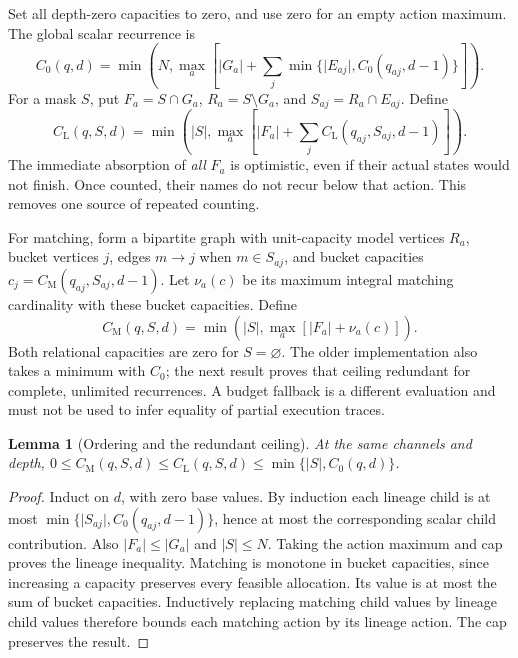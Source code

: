 \documentclass[11pt]{article}
\newtheorem{lemma}[theorem]{Lemma}
\theoremstyle{definition}
\newcommand{\card}[1]{\lvert #1\rvert}
\newcommand{\CL}{C_{\mathrm L}}
\newcommand{\CM}{C_{\mathrm M}}
\begin{document}
Set all depth-zero capacities to zero, and use zero for an empty action maximum.
The global scalar recurrence is
\begin{equation}\label{eq:scalar}
C_0(q,d)=\min\left(N,\max_a\left[\card{G_a}+
       \sum_j\min\{\card{E_{aj}},C_0(q_{aj},d-1)\}\right]\right).
\end{equation}
For a mask $S$, put $F_a=S\cap G_a$, $R_a=S\setminus G_a$, and
$S_{aj}=R_a\cap E_{aj}$. Define
\begin{equation}\label{eq:lineage}
\CL(q,S,d)=\min\left(\card S,\max_a\left[
                   \card{F_a}+\sum_j\CL(q_{aj},S_{aj},d-1)\right]\right).
\end{equation}
The immediate absorption of \emph{all} $F_a$ is optimistic, even if their actual
states would not finish. Once counted, their names do not recur below that
action. This removes one source of repeated counting.

For matching, form a bipartite graph with unit-capacity model vertices $R_a$,
bucket vertices $j$, edges $m\to j$ when $m\in S_{aj}$, and bucket capacities
$c_j=\CM(q_{aj},S_{aj},d-1)$. Let $\nu_a(c)$ be its maximum integral matching
cardinality with these bucket capacities. Define
\begin{equation}\label{eq:matching}
\CM(q,S,d)=\min\left(\card S,\max_a[\card{F_a}+\nu_a(c)]\right).
\end{equation}
Both relational capacities are zero for $S=\varnothing$. The older implementation
also takes a minimum with $C_0$; the next result proves that ceiling redundant
for complete, unlimited recurrences. A budget fallback is a different evaluation
and must not be used to infer equality of partial execution traces.

\begin{lemma}[Ordering and the redundant ceiling]\label{lem:order}
At the same channels and depth,
$0\leq\CM(q,S,d)\leq\CL(q,S,d)\leq\min\{\card S,C_0(q,d)\}$.
\end{lemma}
\begin{proof}
Induct on $d$, with zero base values. By induction each lineage child is at
most $\min\{\card{S_{aj}},C_0(q_{aj},d-1)\}$, hence at most the corresponding
scalar child contribution. Also $\card{F_a}\leq\card{G_a}$ and $\card S\leq N$.
Taking the action maximum and cap proves the lineage inequality. Matching is
monotone in bucket capacities, since increasing a capacity preserves every
feasible allocation. Its value is at most the sum of bucket capacities.
Inductively replacing matching child values by lineage child values therefore
bounds each matching action by its lineage action. The cap preserves the result.
\end{proof}
\end{document}
